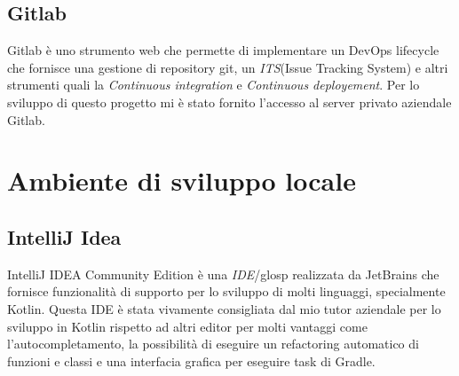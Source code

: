 \subsection{Gitlab}
Gitlab è uno strumento web che permette di implementare un DevOps lifecycle che fornisce una gestione di repository git, un \emph{ITS}\glosp (Issue Tracking System) e altri strumenti quali la \emph{Continuous integration} e \emph{Continuous deployement}. Per lo sviluppo di questo progetto mi è stato fornito l'accesso al server privato aziendale Gitlab.

\section{Ambiente di sviluppo locale}
\subsection{IntelliJ Idea}
IntelliJ IDEA Community Edition è una \emph{IDE}/glosp realizzata da JetBrains che fornisce funzionalità di supporto per lo sviluppo di molti linguaggi, specialmente Kotlin. Questa IDE è stata vivamente consigliata dal mio tutor aziendale per lo sviluppo in Kotlin rispetto ad altri editor per molti vantaggi come l'autocompletamento, la possibilità di eseguire un refactoring automatico di funzioni e classi e una interfacia grafica per eseguire task di Gradle.
 

